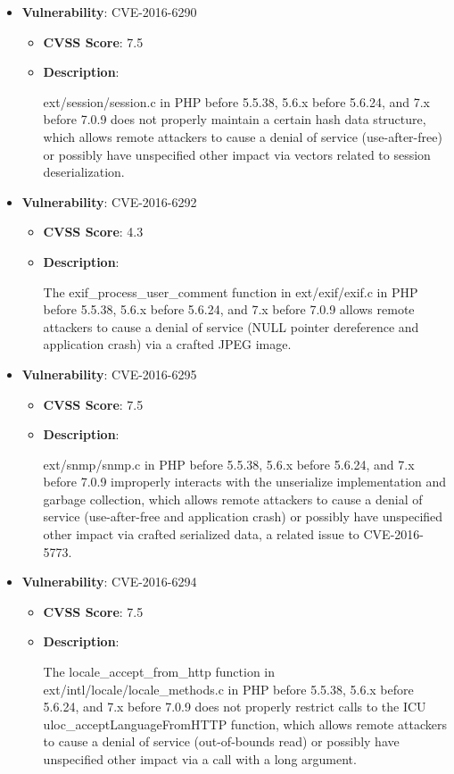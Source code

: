 \documentclass{article}
\begin{document}
\begin{itemize}
        \item \textbf{Vulnerability}: CVE-2016-6290
        \begin{itemize}
            \item \textbf{CVSS Score}:  7.5 
            \item \textbf{Description}:
            \parbox[t]{0.9\linewidth}{
                \ttfamily ext/session/session.c in PHP before 5.5.38, 5.6.x before 5.6.24, and 7.x before 7.0.9 does not properly maintain a certain hash data structure, which allows remote attackers to cause a denial of service (use-after-free) or possibly have unspecified other impact via vectors related to session deserialization.
            }
        \end{itemize}
    
        \item \textbf{Vulnerability}: CVE-2016-6292
        \begin{itemize}
            \item \textbf{CVSS Score}:  4.3 
            \item \textbf{Description}:
            \parbox[t]{0.9\linewidth}{
                \ttfamily The exif\_process\_user\_comment function in ext/exif/exif.c in PHP before 5.5.38, 5.6.x before 5.6.24, and 7.x before 7.0.9 allows remote attackers to cause a denial of service (NULL pointer dereference and application crash) via a crafted JPEG image.
            }
        \end{itemize}
    
        \item \textbf{Vulnerability}: CVE-2016-6295
        \begin{itemize}
            \item \textbf{CVSS Score}:  7.5 
            \item \textbf{Description}:
            \parbox[t]{0.9\linewidth}{
                \ttfamily ext/snmp/snmp.c in PHP before 5.5.38, 5.6.x before 5.6.24, and 7.x before 7.0.9 improperly interacts with the unserialize implementation and garbage collection, which allows remote attackers to cause a denial of service (use-after-free and application crash) or possibly have unspecified other impact via crafted serialized data, a related issue to CVE-2016-5773.
            }
        \end{itemize}
    
        \item \textbf{Vulnerability}: CVE-2016-6294
        \begin{itemize}
            \item \textbf{CVSS Score}:  7.5 
            \item \textbf{Description}:
            \parbox[t]{0.9\linewidth}{
                \ttfamily The locale\_accept\_from\_http function in ext/intl/locale/locale\_methods.c in PHP before 5.5.38, 5.6.x before 5.6.24, and 7.x before 7.0.9 does not properly restrict calls to the ICU uloc\_acceptLanguageFromHTTP function, which allows remote attackers to cause a denial of service (out-of-bounds read) or possibly have unspecified other impact via a call with a long argument.
            }
        \end{itemize}
    

\end{itemize}
\end{document}
